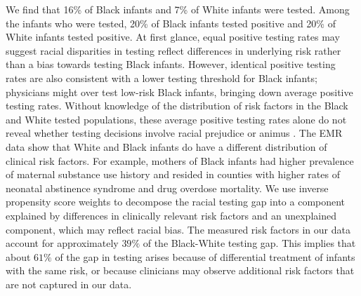 We find that 16\% of Black infants and 7\% of White infants were tested. Among the infants who were tested, 20\% of Black infants tested positive and 20\% of White infants tested positive. At first glance, equal positive testing rates may suggest racial disparities in testing reflect differences in underlying risk rather than a bias towards testing Black infants. However, identical positive testing rates are also consistent with a lower testing threshold for Black infants; physicians might over test low-risk Black infants, bringing down average positive testing rates. Without knowledge of the distribution of risk factors in the Black and White tested populations, these average positive testing rates alone do not reveal whether testing decisions involve racial prejudice or animus \citep{becker1957economics, knowles2001racial, ayres2002outcome}. The EMR data show that White and Black infants do have a different distribution of clinical risk factors. For example, mothers of Black infants had higher prevalence of maternal substance use history and resided in counties with higher rates of neonatal abstinence syndrome and drug overdose mortality. We use inverse propensity score weights to decompose the racial testing gap into a component explained by differences in clinically relevant risk factors and an unexplained component, which may reflect racial bias. The measured risk factors in our data account for approximately $39\%$ of the Black-White testing gap. This implies that about $61\%$ of the gap in testing arises because of differential treatment of infants with the same risk, or because clinicians may observe additional risk factors that are not captured in our data. 

